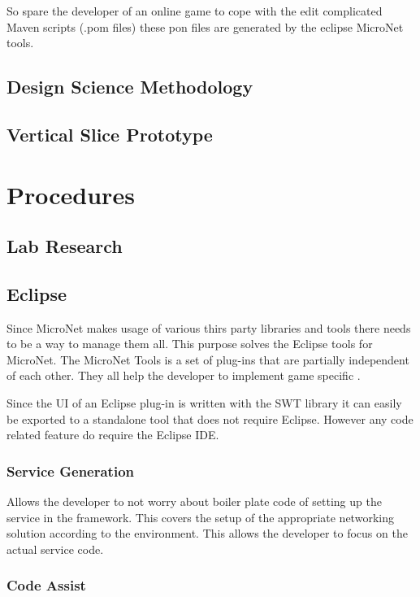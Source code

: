 So spare the developer of an online game to cope with the edit complicated Maven
scripts (.pom files) these pon files are generated by the eclipse MicroNet
tools.

\subsection{Design Science Methodology}
\subsection{Vertical Slice Prototype}

\section{Procedures}

\subsection{Lab Research}

\subsection{Eclipse}

Since MicroNet makes usage of various thirs party libraries and tools there
needs to be a way to manage them all. This purpose solves the Eclipse tools for
MicroNet. The MicroNet Tools is a set of plug-ins that are partially independent
of each other. They all help the developer to implement game specific \mss{}.

Since the UI of an Eclipse plug-in is written with the SWT library it can easily
be exported to a standalone tool that does not require Eclipse. However any code
related feature do require the Eclipse IDE.

\subsubsection{Service Generation}

Allows the developer to not worry about boiler plate code of setting up the
service in the framework. This covers the setup of the appropriate networking
solution according to the environment. This allows the developer to focus on the
actual service code.

\subsubsection{Code Assist}

